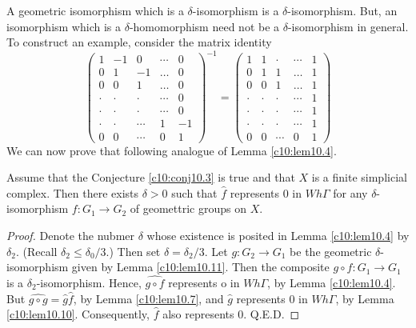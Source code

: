 \begin{remark*}
  A geometric isomorphism which is a $\delta$-isomorphism is a
  $\delta$-isomorphism. But, an isomorphism which is a
  $\delta$-homomorphism need not be a $\delta$-isomorphism in
  general. To construct an example, consider the matrix identity
  $$
  \begin{pmatrix}
    1 & -1 & 0 & \cdots & 0\\
    0 & 1 & -1 & \ldots & 0\\
    0 & 0 & 1 & \ldots & 0\\
    \cdot & \cdot & \cdot & \cdots & 0\\
    \cdot & \cdot & \cdot & \cdots & 0\\
    \cdot & \cdot & \cdots & 1 & -1\\
    0 & 0 & \cdots & 0 & 1
  \end{pmatrix}^{-1} =
  \begin{pmatrix}
    1 & 1 & \cdot & \cdots & 1\\
    0 & 1 & 1 & \ldots & 1\\
    0 & 0 & 1 & \ldots & 1\\
    \cdot & \cdot & \cdot & \cdots & 1\\
    \cdot & \cdot & \cdot & \cdots & 1\\
    \cdot & \cdot & \cdot & \cdots & 1\\
    0 & 0 & \cdots & 0 & 1    
  \end{pmatrix}
  $$
  We can now prove that following analogue of Lemma \ref{c10:lem10.4}.
\end{remark*}

\begin{lemma}\label{c10:lem10.12}
  Assume that the Conjecture \ref{c10:conj10.3} is true and that $X$
  is a finite simplicial complex. Then there exists $\delta > 0$ such
  that $\hat{f}$ represents 0 in $Wh \Gamma$ for any
  $\delta$-isomorphism $f: G_1 \to G_2$ of geomettric groups on $X$.
\end{lemma}

\begin{proof}
  Denote the nubmer $\delta$ whose existence is posited in Lemma
  \ref{c10:lem10.4} by $\delta_2$. (Recall $\delta_2 \leq
  \delta_0/3$.) Then set $\delta= \delta_2/3$. Let $g: G_2 \to G_1$ be
  the geometric $\delta$-isomorphism given by Lemma
  \ref{c10:lem10.11}. Then the composite $g \circ f: G_1 \to G_1$ is a
  $\delta_2$-isomorphism. Hence, $\widehat{g \circ f}$ represents o in
  $W h \Gamma$, by Lemma \ref{c10:lem10.4}. But $\widehat{g \circ g}=
  \hat{g} \hat{f}$, by Lemma \ref{c10:lem10.7}, and $\hat{g}$
  represents 0 in $Wh\Gamma$, by Lemma
  \ref{c10:lem10.10}. Consequently, $\hat{f}$ also represents
  0. \hfill Q.E.D.
\end{proof}

